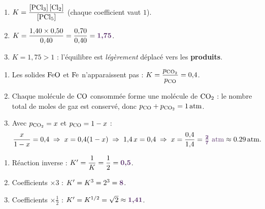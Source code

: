 \documentclass[11pt,a4paper]{article}
\newcommand{\rep}[1]{\textcolor{primarydark}{\textbf{#1}}}
\begin{document}
\begin{center}
\end{center}

\begin{correction}
\begin{enumerate}[label=\alph*),leftmargin=2em,topsep=2pt,itemsep=2pt]
  \item $K = \dfrac{[\ce{PCl3}]\,[\ce{Cl2}]}{[\ce{PCl5}]}$ (chaque coefficient vaut $1$).
  \item $K = \dfrac{1{,}40 \times 0{,}50}{0{,}40} = \dfrac{0{,}70}{0{,}40} = \rep{1{,}75}$.
  \item $K = 1{,}75 > 1$ : l'équilibre est \emph{légèrement} déplacé vers les \rep{produits}.
\end{enumerate}
\end{correction}

\begin{correction}
\begin{enumerate}[label=\alph*),leftmargin=2em,topsep=2pt,itemsep=2pt]
  \item Les solides $\ce{FeO}$ et $\ce{Fe}$ n'apparaissent pas : $K = \dfrac{p_{\ce{CO2}}}{p_{\ce{CO}}} = 0{,}4$.
  \item Chaque molécule de $\ce{CO}$ consommée forme une molécule de $\ce{CO2}$ : le nombre total de moles
        de gaz est conservé, donc $p_{\ce{CO}} + p_{\ce{CO2}} = \SI{1}{atm}$.
  \item Avec $p_{\ce{CO2}}=x$ et $p_{\ce{CO}}=1-x$ :
        \[ \frac{x}{1-x} = 0{,}4 \;\Rightarrow\; x = 0{,}4(1-x) \;\Rightarrow\; 1{,}4\,x = 0{,}4 \;\Rightarrow\;
           x = \frac{0{,}4}{1{,}4} = \textcolor{primarydark}{\boldsymbol{\tfrac{2}{7}}\ \si{atm}} \approx \SI{0.29}{atm}. \]
\end{enumerate}
\end{correction}

\begin{correction}
\begin{enumerate}[label=\alph*),leftmargin=2em,topsep=2pt,itemsep=2pt]
  \item Réaction inverse : $K' = \dfrac{1}{K} = \dfrac{1}{2} = \rep{0{,}5}$.
  \item Coefficients $\times 3$ : $K' = K^3 = 2^3 = \rep{8}$.
  \item Coefficients $\times \tfrac12$ : $K' = K^{1/2} = \sqrt{2} \approx \rep{1{,}41}$.
\end{enumerate}
\end{correction}
\end{document}
